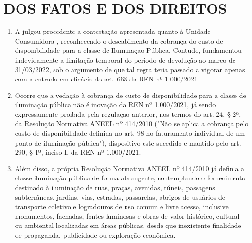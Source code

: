
\newcommand{\tipoRequerimento}{Contestação do marco temporal de devolução e revisão do período faturado}
\newcommand{\tese}{CONTESTAÇÃO}

\section{DOS FATOS E DOS DIREITOS}

\begin{enumerate}[resume]
    \item A \nomeConcessionaria{} julgou procedente a contestação apresentada quanto à Unidade Consumidora \unidadeConsumidora{}, reconhecendo o descabimento da cobrança do custo de disponibilidade para a classe de Iluminação Pública. Contudo, fundamentou indevidamente a limitação temporal do período de devolução ao marco de 31/03/2022, sob o argumento de que tal regra teria passado a vigorar apenas com a entrada em eficácia do art. 668 da REN nº 1.000/2021.
    

    \item Ocorre que a vedação à cobrança de custo de disponibilidade para a classe de iluminação pública não é inovação da REN nº 1.000/2021, já sendo expressamente proibida pela regulação anterior, nos termos do art. 24, § 2º, da Resolução Normativa ANEEL nº 414/2010 ("Não se aplica a cobrança pelo custo de disponibilidade definida no art. 98 no faturamento individual de um ponto de iluminação pública"), dispositivo este sucedido e mantido pelo art. 290, § 1º, inciso I, da REN nº 1.000/2021.

    \item Além disso, a própria Resolução Normativa ANEEL nº 414/2010 já definia a classe iluminação pública de forma abrangente, contemplando o fornecimento destinado à iluminação de ruas, praças, avenidas, túneis, passagens subterrâneas, jardins, vias, estradas, passarelas, abrigos de usuários de transporte coletivo e logradouros de uso comum e livre acesso, inclusive monumentos, fachadas, fontes luminosas e obras de valor histórico, cultural ou ambiental localizadas em áreas públicas, desde que inexistente finalidade de propaganda, publicidade ou exploração econômica.


\end{enumerate}
